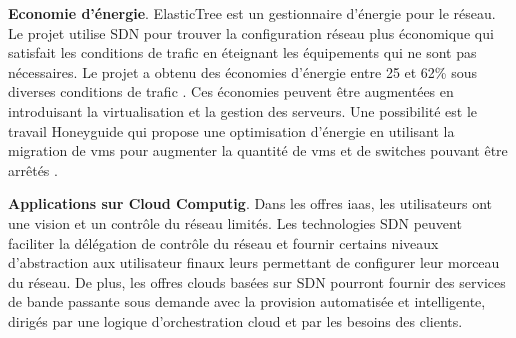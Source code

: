
\textbf{Economie d'énergie}. ElasticTree est un gestionnaire d'énergie pour le réseau. Le projet utilise SDN pour trouver la configuration réseau plus économique qui satisfait les conditions de trafic en éteignant les équipements qui ne sont pas nécessaires. Le projet a obtenu des économies d'énergie entre 25 et 62\% sous diverses conditions de trafic \cite{ElasticTree}. Ces économies peuvent être augmentées en introduisant la virtualisation et la gestion des serveurs. Une possibilité est le travail Honeyguide qui propose une optimisation d'énergie en utilisant la migration de \glspl{vm} pour augmenter la quantité de \glspl{vm} et de switches pouvant être arrêtés \cite{Honeyguide}.




\textbf{Applications sur Cloud Computig}. Dans les offres \gls{iaas}, les utilisateurs ont une vision et un contrôle du réseau  limités. Les technologies SDN peuvent faciliter la délégation de contrôle du réseau et fournir certains niveaux d'abstraction aux utilisateur finaux leurs permettant de configurer leur morceau du réseau. De plus, les offres clouds basées sur SDN pourront fournir des services de bande passante sous demande avec la provision automatisée et intelligente, dirigés par une logique d'orchestration cloud et par les besoins des clients. \cite{AdoptionResearchTrendsCloud}


